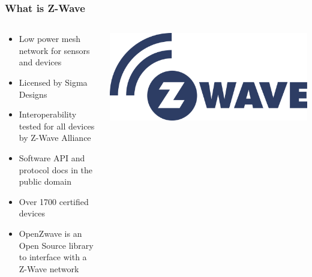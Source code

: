 \documentclass[aspectratio=169,11pt,hyperref={colorlinks=true}]{beamer}
\begin{document}
\begin{frame}
    \frametitle{What is Z-Wave}
    \begin{columns}
        \begin{column}{.48\textwidth}
            \begin{itemize}
                \item Low power mesh network for sensors and devices
                \item Licensed by Sigma Designs
                \item Interoperability tested for all devices by Z-Wave Alliance
                \item Software API and protocol docs in the public domain
                \item Over 1700 certified devices
                \item OpenZwave is an Open Source library to interface with a Z-Wave network
            \end{itemize}
        \end{column}
        \begin{column}{.48\textwidth}
            \includegraphics[width=\textwidth]{zwave.png}
        \end{column}
    \end{columns}
\end{frame}
\end{document}

